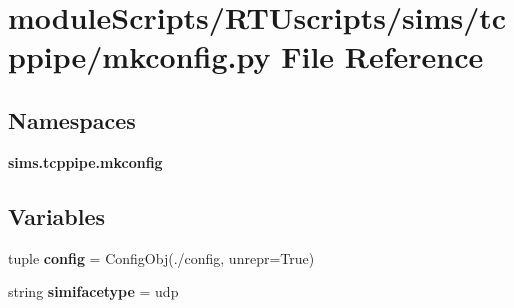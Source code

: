 \section{module\+Scripts/\+R\+T\+Uscripts/sims/tcppipe/mkconfig.py File Reference}
\label{tcppipe_2mkconfig_8py}
\subsection*{Namespaces}
\begin{DoxyCompactItemize}
\item 
 {\bf sims.\+tcppipe.\+mkconfig}
\end{DoxyCompactItemize}
\subsection*{Variables}
\begin{DoxyCompactItemize}
\item 
tuple {\bf config} = Config\+Obj(\textquotesingle{}./config\textquotesingle{}, unrepr=True)
\item 
string {\bf simifacetype} = \textquotesingle{}udp\textquotesingle{}
\end{DoxyCompactItemize}
